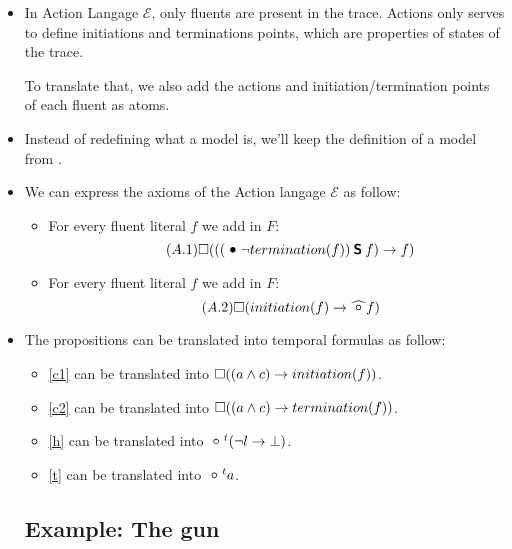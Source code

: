 \begin{itemize}
  \item In Action Langage $\mathcal{E}$, only fluents are present in the trace. Actions only serves to define initiations and terminations points, which are properties of states of the trace.

  To translate that, we also add the actions and initiation/termination points of each fluent as atoms.
  \item Instead of redefining what a model is, we'll keep the definition of a model from \cite{cakascsc18a}.
  \item We can express the axioms of the Action langage $\mathcal{E}$ as follow:
  \begin{itemize}
    \item For every fluent literal $f$ we add in $F$:
      \begin{equation}\tag{$A.1$}
        \alwaysF(((\previous \neg termination(f)) \since f) \rightarrow f)
      \end{equation}
    \item For every fluent literal $f$ we add in $F$:
      \begin{equation}\tag{$A.2$}
        \alwaysF(initiation(f)\rightarrow\wnext f)
      \end{equation}
  \end{itemize}
  \item The propositions can be translated into temporal formulas as follow:
  \begin{itemize}
    \item \ref{c1} can be translated into $\square((a\land c)\rightarrow initiation(f))$.
    \item \ref{c2} can be translated into $\square((a\land c)\rightarrow termination(f))$.
    \item \ref{h} can be translated into $\next^{t}(\neg l\rightarrow \bot)$.
    \item \ref{t} can be translated into $\next^{t}a$.
  \end{itemize}

\subsection{Example: The gun}


\end{itemize}
